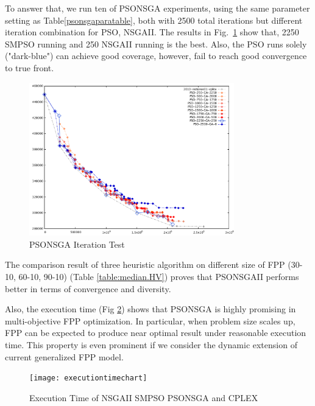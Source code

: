 \documentclass[10pt,journal,compsoc]{IEEEtran}
\newcommand{\Fig}[1]{Fig.~\ref{#1}}
\begin{document}
To answer that, we run ten of PSONSGA experiments, using the same parameter setting as Table\ref{psonsgaparatable}, both with 2500 total iterations but different iteration combination for PSO, NSGAII. The results in \Fig{psonsgaitertest} show that, 2250 SMPSO running and 250 NSGAII running is the best. Also, the PSO runs solely ("dark-blue") can achieve good coverage, however, fail to reach good convergence to true front. 
\begin{figure}[H]
\centerline{\includegraphics[page=1,width=3.5in]{PSONSGAII_SettingTest.pdf}}
\caption{PSONSGA Iteration Test} 
\label{psonsgaitertest}
\end{figure}

The comparison result of three heuristic algorithm on different size of FPP (30-10, 60-10, 90-10) (Table \ref{table:median.HV}) proves that PSONSGAII performs better in terms of convergence and diversity.
\begin{table}[h]
\caption{Hyper-Volume Indicator on Three Heuristic Algorithms}
\label{table:median.HV}
\end{table}

Also, the execution time (Fig \ref{eta}) shows that PSONSGA is highly promising in multi-objective FPP optimization. In particular, when problem size scales up, FPP can be expected to produce near optimal result under reasonable execution time. This property is even prominent if we consider the dynamic extension of current generalized FPP model. 
\begin{figure}[H]
\centerline{\texttt{[image: executiontimechart]}}
\caption{Execution Time of NSGAII SMPSO PSONSGA and CPLEX} 
\label{eta}
\end{figure}
\fi
\end{document}
